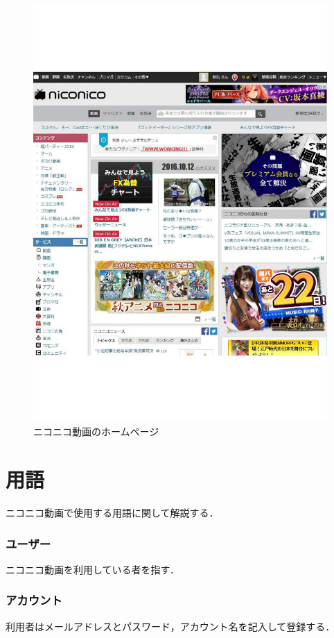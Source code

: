 \begin{figure}[htb]
\centering
\includegraphics[width=14cm]{pppp.pdf}
\caption{ニコニコ動画のホームページ}\label{aaa}
\end{figure}


\clearpage

\section{用語}
ニコニコ動画で使用する用語に関して解説する．

\subsubsection*{ユーザー}
ニコニコ動画を利用している者を指す．

\subsubsection*{アカウント}
利用者はメールアドレスとパスワード，アカウント名を記入して登録する．

